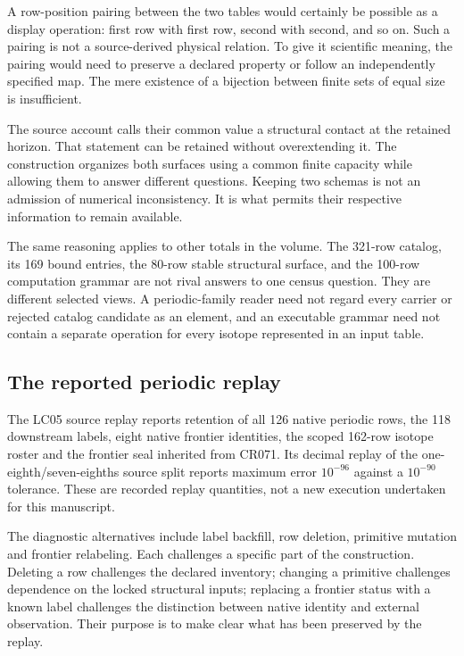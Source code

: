 A row-position pairing between the two tables would certainly be possible as a display operation: first row with first row, second with second, and so on. Such a pairing is not a source-derived physical relation. To give it scientific meaning, the pairing would need to preserve a declared property or follow an independently specified map. The mere existence of a bijection between finite sets of equal size is insufficient.

The source account calls their common value a structural contact at the retained horizon. That statement can be retained without overextending it. The construction organizes both surfaces using a common finite capacity while allowing them to answer different questions. Keeping two schemas is not an admission of numerical inconsistency. It is what permits their respective information to remain available.

The same reasoning applies to other totals in the volume. The 321-row catalog, its 169 bound entries, the 80-row stable structural surface, and the 100-row computation grammar are not rival answers to one census question. They are different selected views. A periodic-family reader need not regard every carrier or rejected catalog candidate as an element, and an executable grammar need not contain a separate operation for every isotope represented in an input table.

\subsection{The reported periodic replay}

The LC05 source replay reports retention of all 126 native periodic rows, the 118 downstream labels, eight native frontier identities, the scoped 162-row isotope roster and the frontier seal inherited from CR071. Its decimal replay of the one-eighth/seven-eighths source split reports maximum error $10^{-96}$ against a $10^{-90}$ tolerance. These are recorded replay quantities, not a new execution undertaken for this manuscript.\cite{viireview}

The diagnostic alternatives include label backfill, row deletion, primitive mutation and frontier relabeling. Each challenges a specific part of the construction. Deleting a row challenges the declared inventory; changing a primitive challenges dependence on the locked structural inputs; replacing a frontier status with a known label challenges the distinction between native identity and external observation. Their purpose is to make clear what has been preserved by the replay.

